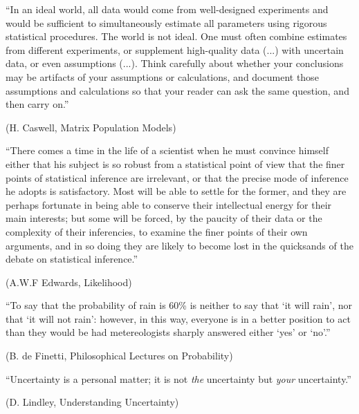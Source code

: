 
\cleardoublepage
\null
\vfill

\noindent
``In an ideal world, all data would come from well-designed experiments
and would be sufficient to simultaneously estimate all parameters using rigorous
statistical procedures. The world is not ideal. One must often combine estimates
from different experiments, or supplement high-quality data (...) with uncertain
data, or even assumptions (...). Think carefully about whether your conclusions
may be artifacts of your assumptions or calculations, and document those assumptions
and calculations so that your reader can ask the same question, and then carry on.''
\begin{flushright}
(H. Caswell, Matrix Population Models)
\end{flushright}

\vfill

\noindent
``There comes a time in the life of a scientist when he must convince himself
either that his subject is so robust from a statistical point of view that
the finer points of statistical inference are irrelevant, or that the precise
mode of inference he adopts is satisfactory. Most will be able to settle for
the former, and they are perhaps fortunate in being able to conserve their
intellectual energy for their main interests; but some will be forced, by the
paucity of their data or the complexity of their inferencies, to examine
the finer points of their own arguments, and in so doing they are likely
to become lost in the quicksands of the debate on statistical inference.''
\begin{flushright}
(A.W.F Edwards, Likelihood)
\end{flushright}

\vfill

\noindent
``To say that the probability of rain is 60\% is neither to say that
`it will rain', nor that `it will not rain': however, in this way,
everyone is in a better position to act than they would be had
metereologists sharply answered either `yes' or `no'.''
\begin{flushright}
(B. de Finetti, Philosophical Lectures on Probability)
\end{flushright}

\vfill

\noindent
``Uncertainty is a personal matter; it is not {\em the} uncertainty but {\em your} uncertainty.''
\begin{flushright}
(D. Lindley, Understanding Uncertainty)
\end{flushright}
\vfill

\cleardoublepage
